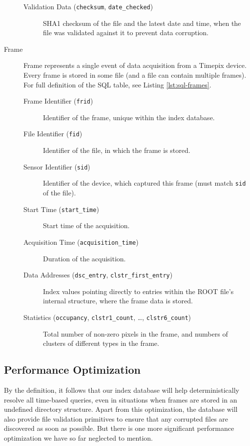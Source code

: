 \begin{description}
\begin{description}
		\item[Validation Data (\texttt{checksum}, \texttt{date\_checked})]
		SHA1 checksum of the file and the latest date and time, when the file was validated against it to prevent data corruption.
	\end{description}

	\item[Frame]
	Frame represents a single event of data acquisition from a Timepix device. Every frame is stored in some file (and a file can contain multiple frames). For full definition of the SQL table, see Listing \ref{lst:sql-frames}.

	\begin{description}
		\item[Frame Identifier (\texttt{frid})] 
		Identifier of the frame, unique within the index database.

		\item[File Identifier (\texttt{fid})]
		Identifier of the file, in which the frame is stored.

		\item[Sensor Identifier (\texttt{sid})] 
		Identifier of the device, which captured this frame (must match \texttt{sid} of the file).

		\item[Start Time (\texttt{start\_time})] 
		Start time of the acquisition.

		\item[Acquisition Time (\texttt{acquisition\_time})] 
		Duration of the acquisition.

		\item[Data Addresses (\texttt{dsc\_entry}, \texttt{clstr\_first\_entry})]
		Index values pointing directly to entries within the ROOT file's internal structure, where the frame data is stored.

		\item[Statistics (\texttt{occupancy}, \texttt{clstr1\_count}, \dots, \texttt{clstr6\_count})]
		Total number of non-zero pixels in the frame, and numbers of clusters of different types in the frame.
	\end{description}
\end{description}


\subsection{Performance Optimization}
By the definition, it follows that our index database will help deterministically resolve all time-based queries, even in situations when frames are stored in an undefined directory structure. Apart from this optimization, the database will also provide file validation primitives to ensure that any corrupted files are discovered as soon as possible. But there is one more significant performance optimization we have so far neglected to mention.

